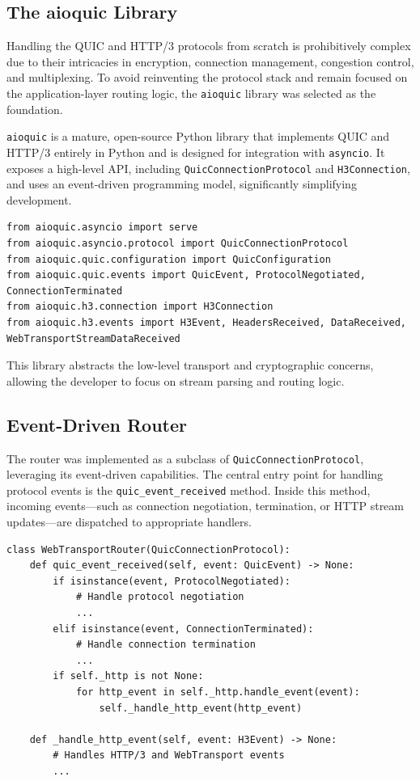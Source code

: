 \subsection{The aioquic Library}

Handling the QUIC and HTTP/3 protocols from scratch is prohibitively complex due to their intricacies in encryption, connection management, congestion control, and multiplexing. To avoid reinventing the protocol stack and remain focused on the application-layer routing logic, the \texttt{aioquic} library was selected as the foundation.

\texttt{aioquic} is a mature, open-source Python library that implements QUIC and HTTP/3 entirely in Python and is designed for integration with \texttt{asyncio}. It exposes a high-level API, including \texttt{QuicConnectionProtocol} and \texttt{H3Connection}, and uses an event-driven programming model, significantly simplifying development.

\begin{lstlisting}
from aioquic.asyncio import serve
from aioquic.asyncio.protocol import QuicConnectionProtocol
from aioquic.quic.configuration import QuicConfiguration
from aioquic.quic.events import QuicEvent, ProtocolNegotiated, ConnectionTerminated
from aioquic.h3.connection import H3Connection
from aioquic.h3.events import H3Event, HeadersReceived, DataReceived, WebTransportStreamDataReceived
\end{lstlisting}

This library abstracts the low-level transport and cryptographic concerns, allowing the developer to focus on stream parsing and routing logic.

\subsection{Event-Driven Router}

The router was implemented as a subclass of \texttt{QuicConnectionProtocol}, leveraging its event-driven capabilities. The central entry point for handling protocol events is the \texttt{quic\_event\_received} method. Inside this method, incoming events—such as connection negotiation, termination, or HTTP stream updates—are dispatched to appropriate handlers.

\begin{lstlisting}
class WebTransportRouter(QuicConnectionProtocol):
    def quic_event_received(self, event: QuicEvent) -> None:
        if isinstance(event, ProtocolNegotiated):
            # Handle protocol negotiation
            ...
        elif isinstance(event, ConnectionTerminated):
            # Handle connection termination
            ...
        if self._http is not None:
            for http_event in self._http.handle_event(event):
                self._handle_http_event(http_event)

    def _handle_http_event(self, event: H3Event) -> None:
        # Handles HTTP/3 and WebTransport events
        ...
\end{lstlisting}


